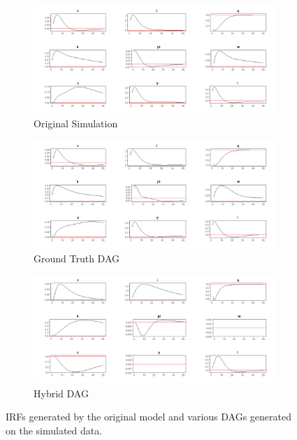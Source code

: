\documentclass{article}
\begin{document}
\begin{figure}

  \centering
  \begin{subfigure}{0.8\textwidth}
    \centering
    \includegraphics[width=\linewidth]{images/sw_sim_qs_irf.png} 
    \caption{Original Simulation}
    \label{sw_simirf}
  \end{subfigure}
  \begin{subfigure}{0.8\textwidth}
    \centering  
    \includegraphics[width=\linewidth]{images/sw_gt_qs_irf.png}
    \caption{Ground Truth DAG}
    \label{sw_gtirf}
  \end{subfigure}
  \begin{subfigure}{0.8\textwidth}
    \centering  
    \includegraphics[width=\linewidth]{images/sw_hybrid_51_qs_irfs.png}
    \caption{Hybrid DAG}
    \label{sw_hirf}
  \end{subfigure}

  \caption{IRFs generated by the original model and various DAGs generated on the simulated data.}
  \label{swirf}
\end{figure}
\end{document}
